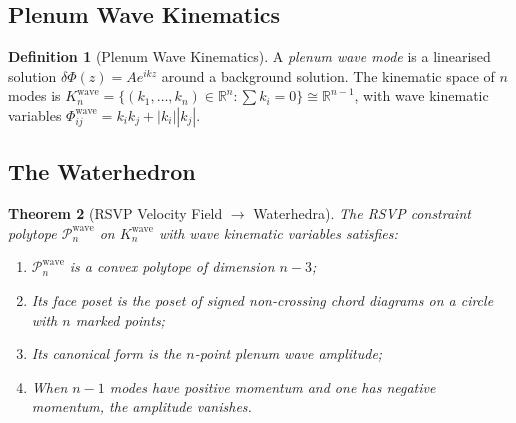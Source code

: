 \documentclass[12pt, oneside]{amsart}
\theoremstyle{plain}
\newtheorem{theorem}{Theorem}[section]
\theoremstyle{definition}
\newtheorem{definition}[theorem]{Definition}
\theoremstyle{remark}
\newcommand{\R}{\mathbb{R}}
\newcommand{\Phif}{\Phi}   %
\begin{document}
\subsection{Plenum Wave Kinematics}

\begin{definition}[Plenum Wave Kinematics]
A \emph{plenum wave mode} is a linearised solution $\delta\Phif(z) = A e^{ikz}$ around a background solution. The kinematic space of $n$ modes is $K_n^{\mathrm{wave}} = \{(k_1,\ldots,k_n) \in \R^n : \sum k_i = 0\} \cong \R^{n-1}$, with wave kinematic variables $\Phif_{ij}^{\mathrm{wave}} = k_i k_j + |k_i||k_j|$.
\end{definition}

\subsection{The Waterhedron}

\begin{theorem}[RSVP Velocity Field $\to$ Waterhedra]
\label{thm:water}
The RSVP constraint polytope $\mathcal{P}_n^{\mathrm{wave}}$ on $K_n^{\mathrm{wave}}$ with wave kinematic variables satisfies:
\begin{enumerate}[label=(\roman*)]
  \item $\mathcal{P}_n^{\mathrm{wave}}$ is a convex polytope of dimension $n-3$;
  \item Its face poset is the poset of signed non-crossing chord diagrams on a circle with $n$ marked points;
  \item Its canonical form is the $n$-point plenum wave amplitude;
  \item When $n-1$ modes have positive momentum and one has negative momentum, the amplitude vanishes.
\end{enumerate}
\end{theorem}
\end{document}
